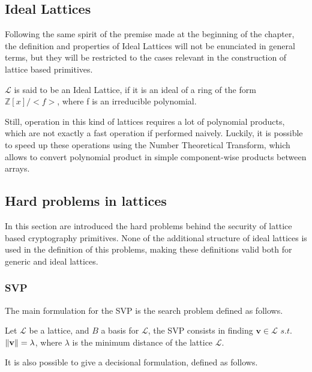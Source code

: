 \subsection{Ideal Lattices}

Following the same spirit of the premise made at the beginning of the chapter, the definition and properties of Ideal Lattices will not be enunciated in general terms, but they will be restricted to the cases relevant in the construction of lattice based primitives.

\begin{definition}
$\mathscr{L}$ is said to be an Ideal Lattice, if it is an ideal of a ring of the form $\mathbb{Z}[x]/<f>$, where f is an irreducible polynomial.  
\end{definition}


Still, operation in this kind of lattices requires a lot of polynomial products, which are not exactly a fast operation if performed naively. Luckily, it is possible to speed up these operations using the Number Theoretical Transform, which allows to convert polynomial product in simple component-wise products between arrays. 

\subsection{Hard problems in lattices}
In this section are introduced the hard problems behind the security of lattice based cryptography primitives. None of the additional structure of ideal lattices is used in the definition of this problems, making these definitions valid both for generic and ideal lattices.

\subsubsection{SVP}

The main formulation for the SVP is the search problem defined as follows.

\begin{definition}
Let $\mathscr{L}$ be a lattice, and $B$ a basis for $\mathscr{L}$, the SVP consists in finding $\mathbf{v}\in\mathscr{L}$ $s.t.$ $\left\lVert \mathbf{v} \right\rVert = \lambda$, where $\lambda$ is the minimum distance of the lattice $\mathscr{L}$.
\end{definition}

It is also possible to give a decisional formulation, defined as follows.

